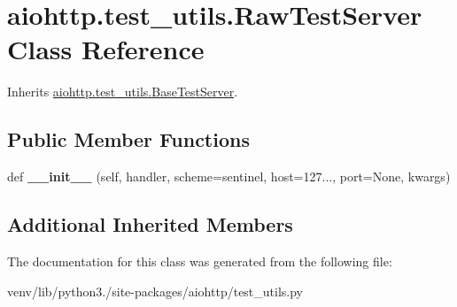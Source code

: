 \hypertarget{classaiohttp_1_1test__utils_1_1_raw_test_server}{}\section{aiohttp.\+test\+\_\+utils.\+Raw\+Test\+Server Class Reference}
\label{classaiohttp_1_1test__utils_1_1_raw_test_server}


Inherits \hyperlink{classaiohttp_1_1test__utils_1_1_base_test_server}{aiohttp.\+test\+\_\+utils.\+Base\+Test\+Server}.

\subsection*{Public Member Functions}
\begin{DoxyCompactItemize}
\item 
\mbox{\label{classaiohttp_1_1test__utils_1_1_raw_test_server_aa4e0196a34f9854a8054e1666c1bedca}} 
def {\bfseries \+\_\+\+\_\+init\+\_\+\+\_\+} (self, handler, scheme=sentinel, host=\textquotesingle{}127...\textquotesingle{}, port=None, kwargs)
\end{DoxyCompactItemize}
\subsection*{Additional Inherited Members}


The documentation for this class was generated from the following file\+:\begin{DoxyCompactItemize}
\item 
venv/lib/python3./site-\/packages/aiohttp/test\+\_\+utils.\+py\end{DoxyCompactItemize}
